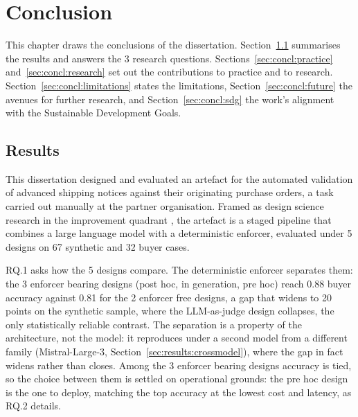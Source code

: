 
\chapter{Conclusion} \label{chap:conclusions}

This chapter draws the conclusions of the dissertation. Section~\ref{sec:concl:results} summarises the results and answers the 3 research questions. Sections~\ref{sec:concl:practice} and~\ref{sec:concl:research} set out the contributions to practice and to research. Section~\ref{sec:concl:limitations} states the limitations, Section~\ref{sec:concl:future} the avenues for further research, and Section~\ref{sec:concl:sdg} the work's alignment with the Sustainable Development Goals.

\section{Results}
\label{sec:concl:results}

This dissertation designed and evaluated an artefact for the automated validation of advanced shipping notices against their originating purchase orders, a task carried out manually at the partner organisation. Framed as design science research in the improvement quadrant \citep{gregor2013dsr}, the artefact is a staged pipeline that combines a large language model with a deterministic enforcer, evaluated under 5 designs on 67 synthetic and 32 buyer cases.

RQ.1 asks how the 5 designs compare. The deterministic enforcer separates them: the 3 enforcer bearing designs (post hoc, in generation, pre hoc) reach 0.88 buyer accuracy against 0.81 for the 2 enforcer free designs, a gap that widens to 20 points on the synthetic sample, where the LLM-as-judge design collapses, the only statistically reliable contrast. The separation is a property of the architecture, not the model: it reproduces under a second model from a different family (Mistral-Large-3, Section~\ref{sec:results:crossmodel}), where the gap in fact widens rather than closes. Among the 3 enforcer bearing designs accuracy is tied, so the choice between them is settled on operational grounds: the pre hoc design is the one to deploy, matching the top accuracy at the lowest cost and latency, as RQ.2 details.

